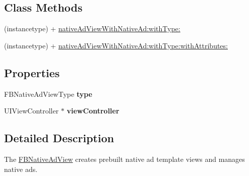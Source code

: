 \subsection*{Class Methods}
\begin{DoxyCompactItemize}
\item 
(instancetype) + \hyperlink{interface_f_b_native_ad_view_a60b61b326f99bb6d5133bf69ac68c1de}{native\-Ad\-View\-With\-Native\-Ad\-:with\-Type\-:}
\item 
(instancetype) + \hyperlink{interface_f_b_native_ad_view_acf3de61d2f27f5d8595dd4253ea8e1d9}{native\-Ad\-View\-With\-Native\-Ad\-:with\-Type\-:with\-Attributes\-:}
\end{DoxyCompactItemize}
\subsection*{Properties}
\begin{DoxyCompactItemize}
\item 
\hypertarget{interface_f_b_native_ad_view_aa62668e1d685c651b3140ab6b50de374}{F\-B\-Native\-Ad\-View\-Type {\bfseries type}}\label{interface_f_b_native_ad_view_aa62668e1d685c651b3140ab6b50de374}

\item 
\hypertarget{interface_f_b_native_ad_view_a9ecd59486803ea433ba7e9c0d186d145}{U\-I\-View\-Controller $\ast$ {\bfseries view\-Controller}}\label{interface_f_b_native_ad_view_a9ecd59486803ea433ba7e9c0d186d145}

\end{DoxyCompactItemize}


\subsection{Detailed Description}
The \hyperlink{interface_f_b_native_ad_view}{F\-B\-Native\-Ad\-View} creates prebuilt native ad template views and manages native ads. 

